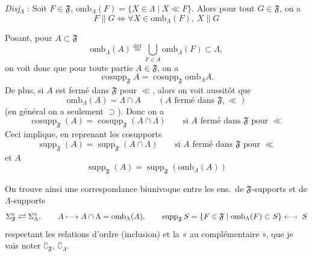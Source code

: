 \documentclass[11pt,a4paper]{article}
\begin{document}
\emph{Disj}$_{\Lambda}$ : Soit $F \in \mathfrak{F}$, $\mathrm{omb}_{\Lambda}(F) = \lbrace X \in \Lambda \mid X \ll F \rbrace$. Alors pour tout $G \in \mathfrak{F}$, on a
\[
  F \parallel G \iff \forall X \in \mathrm{omb}_{\Lambda}(F),\ X \parallel G
\]

Posant, pour $A \subset \mathfrak{F}$
\[
  \mathrm{omb}_{\Lambda}(A) \overset{\mathrm{déf}}{=} \bigcup_{F \in A} \mathrm{omb}_{\Lambda}(F) \subset \Lambda ,
\]
on voit donc que pour toute partie $A \in \mathfrak{F}$, on a
\[
  \operatorname{cosupp}_{\mathfrak{F}} A = \operatorname{cosupp}_{\mathfrak{F}} \mathrm{omb}_{\Lambda} A .
\]
De plus, si $A$ est fermé dans  $\mathfrak{F}$ pour $\ll$, alors on voit aussitôt que
\[
  \mathrm{omb}_{\Lambda}(A) = \Lambda \cap A \qquad (A \text{ fermé dans } \mathfrak{F}, \ll)
\]
(en général on a seulement $\supset$). Donc on a 
\[
  \operatorname{cosupp}_{\mathfrak{F}}(A) = \operatorname{cosupp}_{\mathfrak{F}}(A \cap \Lambda) \qquad \text{si } A \text{ fermé dans } \mathfrak{F} \text{ pour } \ll
\]
Ceci implique, en reprenant les cosupports
\[
  \operatorname{supp}_{\mathfrak{F}}(A) = \operatorname{supp}_{\mathfrak{F}}(A \cap \Lambda) \qquad \text{si } A \text{ fermé dans } \mathfrak{F} \text{ pour } \ll
\]
et  $A$
\[
  \operatorname{supp}_{\mathfrak{F}}(A) = \operatorname{supp}_{\mathfrak{F}}(\mathrm{omb}_{\Lambda}(A))
\]

On trouve ainsi une correspondance biunivoque entre les ens.\ de $\mathfrak{F}$-supports et de $\Lambda$-supports
\[
  \Sigma^{\circ}_{\mathfrak{F}} \rightleftarrows \Sigma^{\circ}_{\Lambda} , \qquad
  A \longmapsto A \cap \Lambda = \mathrm{omb}_{\Lambda}(A) , \qquad
  \operatorname{supp}_{\mathfrak{F}} S = \lbrace F \in \mathfrak{F} \mid \mathrm{omb}_{\Lambda}(F) \subset S \rbrace \longleftarrow\!\shortmid\ S
\]
respectant les relations d'ordre (inclusion) et la «  au complémentaire », que je vais noter $\complement_{\mathfrak{F}}$, $\complement_{\Lambda}$.
\end{document}
